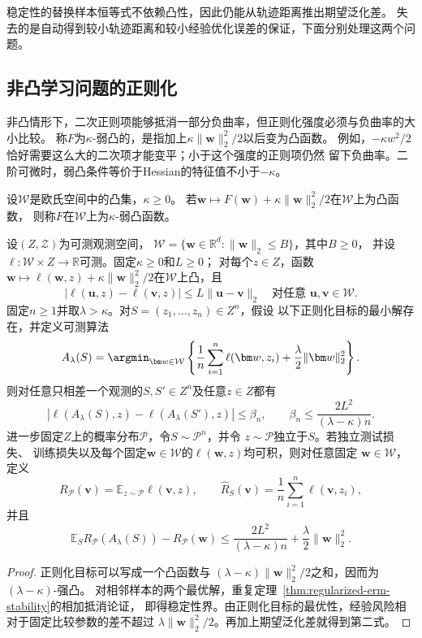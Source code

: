 稳定性的替换样本恒等式不依赖凸性，因此仍能从轨迹距离推出期望泛化差。
失去的是自动得到较小轨迹距离和较小经验优化误差的保证，下面分别处理这两个问题。

\subsection{非凸学习问题的正则化}

非凸情形下，二次正则项能够抵消一部分负曲率，但正则化强度必须与负曲率的大小比较。
称$F$为$\kappa$-弱凸的，是指加上$\kappa\|\bm w\|_2^2/2$以后变为凸函数。
例如，$-\kappa w^2/2$恰好需要这么大的二次项才能变平；小于这个强度的正则项仍然
留下负曲率。二阶可微时，弱凸条件等价于Hessian的特征值不小于$-\kappa$。

\begin{definition}[弱凸函数]
\label{def:weakly-convex}
设$\mathcal W$是欧氏空间中的凸集，$\kappa\geq0$。
若$\bm w\mapsto F(\bm w)+\kappa\|\bm w\|_2^2/2$在$\mathcal W$上为凸函数，
则称$F$在$\mathcal W$上为$\kappa$-弱凸函数。
\end{definition}

\begin{theorem}[弱凸损失的正则化稳定性]
\label{thm:weakly-convex-regularization}
设$(Z,\mathcal Z)$为可测观测空间，
$\mathcal W=\{\bm w\in\mathbb R^d:\|\bm w\|_2\leq B\}$，其中$B\geq0$，
并设$\ell:\mathcal W\times Z\to\mathbb R$可测。固定$\kappa\geq0$和$L\geq0$；
对每个$z\in Z$，函数
$\bm w\mapsto\ell(\bm w,z)+\kappa\|\bm w\|_2^2/2$在$\mathcal W$上凸，且
\[
 |\ell(\bm u,z)-\ell(\bm v,z)|\leq L\|\bm u-\bm v\|_2
 \quad\text{对任意 }\bm u,\bm v\in\mathcal W.
\]
固定$n\geq1$并取$\lambda>\kappa$。对$S=(z_1,\ldots,z_n)\in Z^n$，假设
以下正则化目标的最小解存在，并定义可测算法
\[
 A_\lambda(S)=\argmin_{\bm w\in\mathcal W}
 \left\{\frac1n\sum_{i=1}^n\ell(\bm w,z_i)
 +\frac\lambda2\|\bm w\|_2^2\right\}.
\]
则对任意只相差一个观测的$S,S'\in Z^n$及任意$z\in Z$都有
\[
 |\ell(A_\lambda(S),z)-\ell(A_\lambda(S'),z)|
 \leq\beta_n,\qquad
 \beta_n\leq\frac{2L^2}{(\lambda-\kappa)n}.
\]
进一步固定$Z$上的概率分布$\mathcal P$，令$S\sim\mathcal P^n$，并令
$z\sim\mathcal P$独立于$S$。若独立测试损失、
训练损失以及每个固定$\bm w\in\mathcal W$的$\ell(\bm w,z)$均可积，则对任意固定
$\bm w\in\mathcal W$，定义
\[
 R_{\mathcal P}(\bm v)=\mathbb E_{z\sim\mathcal P}\ell(\bm v,z),
 \qquad
 \hat R_S(\bm v)=\frac1n\sum_{i=1}^n\ell(\bm v,z_i),
\]
并且
\[
 \mathbb E_S R_{\mathcal P}(A_\lambda(S))-R_{\mathcal P}(\bm w)
 \leq\frac{2L^2}{(\lambda-\kappa)n}+\frac\lambda2\|\bm w\|_2^2.
\]
\end{theorem}
\begin{proof}
正则化目标可以写成一个凸函数与
$(\lambda-\kappa)\|\bm w\|_2^2/2$之和，因而为$(\lambda-\kappa)$-强凸。
对相邻样本的两个最优解，重复定理~\ref{thm:regularized-erm-stability}的相加抵消论证，
即得稳定性界。由正则化目标的最优性，经验风险相对于固定比较参数的差不超过
$\lambda\|\bm w\|_2^2/2$。再加上期望泛化差就得到第二式。
\end{proof}

